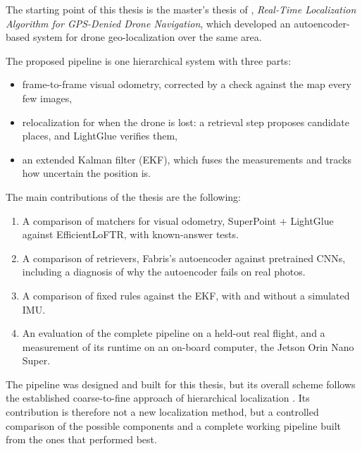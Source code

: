 \documentclass[english, Lau, oneside]{sapthesis}%
\begin{document}
The starting point of this thesis is the master's thesis of \citet{fabris2025thesis}, \textit{Real-Time Localization Algorithm for GPS-Denied Drone Navigation}, which developed an autoencoder-based system for drone geo-localization over the same area.

The proposed pipeline is one hierarchical system with three parts:
\begin{itemize}
\item frame-to-frame visual odometry, corrected by a check against the map every few images,
\item relocalization for when the drone is lost: a retrieval step proposes candidate places, and LightGlue verifies them,
\item an extended Kalman filter (EKF), which fuses the measurements and tracks how uncertain the position is.
\end{itemize}

The main contributions of the thesis are the following:
\begin{enumerate}
\item A comparison of matchers for visual odometry, SuperPoint + LightGlue against EfficientLoFTR, with known-answer tests.
\item A comparison of retrievers, Fabris's autoencoder against pretrained CNNs, including a diagnosis of why the autoencoder fails on real photos.
\item A comparison of fixed rules against the EKF, with and without a simulated IMU.
\item An evaluation of the complete pipeline on a held-out real flight, and a measurement of its runtime on an on-board computer, the Jetson Orin Nano Super.
\end{enumerate}

The pipeline was designed and built for this thesis, but its overall scheme follows the established coarse-to-fine approach of hierarchical localization \citep{sarlin2019hloc}. Its contribution is therefore not a new localization method, but a controlled comparison of the possible components and a complete working pipeline built from the ones that performed best.
\end{document}
